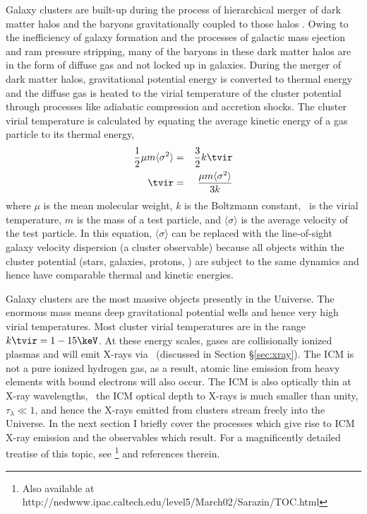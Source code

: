 Galaxy clusters are built-up during the process of hierarchical merger
of dark matter halos and the baryons gravitationally coupled to those
halos \citep{white&rees}. Owing to the inefficiency of galaxy
formation and the processes of galactic mass ejection and ram pressure
stripping, many of the baryons in these dark matter halos are in the
form of diffuse gas and not locked up in galaxies. During the merger
of dark matter halos, gravitational potential energy is converted to
thermal energy and the diffuse gas is heated to the virial temperature
of the cluster potential through processes like adiabatic compression
and accretion shocks. The cluster virial temperature is calculated by
equating the average kinetic energy of a gas particle to its thermal
energy,
\begin{eqnarray}
\frac{1}{2} \mu m \langle\sigma^2\rangle &=& \frac{3}{2}k \tvir\\
\tvir &=& \frac{\mu m \langle\sigma^2\rangle}{3k}
\end{eqnarray}
where $\mu$ is the mean molecular weight, $k$ is the Boltzmann
constant, \tvir\ is the virial temperature, $m$ is the mass of a test
particle, and $\langle \sigma \rangle$ is the average velocity of the
test particle. In this equation, $\langle \sigma \rangle$ can be
replaced with the line-of-sight galaxy velocity dispersion (a cluster
observable) because all objects within the cluster potential (stars,
galaxies, protons, \etc) are subject to the same dynamics and hence
have comparable thermal and kinetic energies.

Galaxy clusters are the most massive objects presently in the
Universe. The enormous mass means deep gravitational potential wells
and hence very high virial temperatures. Most cluster virial
temperatures are in the range $k\tvir = 1-15 \keV$. At these energy
scales, gases are collisionally ionized plasmas and will emit X-rays
via \tb\ (discussed in Section \S\ref{sec:xray}). The ICM is not a
pure ionized hydrogen gas, as a result, atomic line emission from
heavy elements with bound electrons will also occur. The ICM is also
optically thin at X-ray wavelengths, \eg\ the ICM optical depth to
X-rays is much smaller than unity, $\tau_{\lambda} \ll 1$, and hence
the X-rays emitted from clusters stream freely into the Universe. In
the next section I briefly cover the processes which give rise to ICM
X-ray emission and the observables which result. For a magnificently
detailed treatise of this topic, see \citet{sarazinbook}\footnote{Also
available at
http://nedwww.ipac.caltech.edu/level5/March02/Sarazin/TOC.html} and
references therein.

